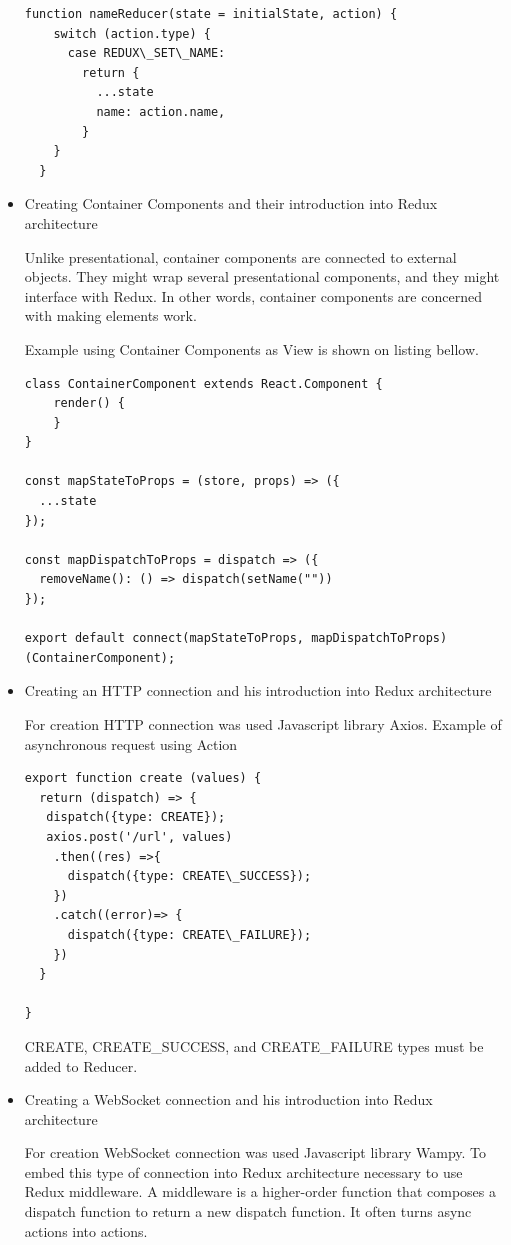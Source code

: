 \documentclass[thesis=B,english]{FITthesis}[2019/03/06]
\begin{document}
\begin{itemize}
\begin{lstlisting}[float, caption=Source code of the nameReducer function, label=code:nameReducer]
  function nameReducer(state = initialState, action) {
    switch (action.type) {
      case REDUX\_SET\_NAME:
        return {
          ...state
          name: action.name,
        } 
    }
  }
\end{lstlisting}  
  
  \item Creating Container Components and their introduction into Redux architecture
  
Unlike presentational, container components are connected to external objects. They might wrap several presentational components, and they might interface with Redux. In other words,  container components are concerned with making elements work.

Example using Container Components as View is shown on listing bellow. 


\begin{lstlisting}[float, caption=Part of the ContainerComponent class source code, label=code:ContainerComponent]
class ContainerComponent extends React.Component { 
    render() { 
    }
}

const mapStateToProps = (store, props) => ({
  ...state
});

const mapDispatchToProps = dispatch => ({
  removeName(): () => dispatch(setName("")) 
});

export default connect(mapStateToProps, mapDispatchToProps)(ContainerComponent);
\end{lstlisting} 
  
  \item Creating an HTTP connection and his introduction into Redux architecture
  
    For creation HTTP connection was used Javascript library Axios. 
    Example of asynchronous request using Action 

\begin{lstlisting}[float, caption=The source code of the create function, label=code:create]
export function create (values) { 
  return (dispatch) => {
   dispatch({type: CREATE});
   axios.post('/url', values)   
    .then((res) =>{
      dispatch({type: CREATE\_SUCCESS});
    })
    .catch((error)=> {
      dispatch({type: CREATE\_FAILURE});
    })
  }

}
\end{lstlisting}

CREATE, CREATE\_SUCCESS, and  CREATE\_FAILURE types must be added to Reducer.     
  
  \item Creating a WebSocket connection and his introduction into Redux architecture
  
      For creation WebSocket connection was used Javascript library Wampy. 
    To embed this type of connection into Redux architecture necessary to use Redux middleware.
    A middleware is a higher-order function that composes a dispatch function to return a new dispatch function. It often turns async actions into actions.
  
\end{itemize}
\end{document}
